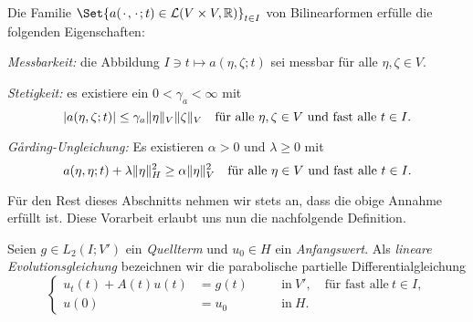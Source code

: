 \documentclass[../main.tex]{subfiles}
\begin{document}
\begin{Annahme}
\label{annahme:eigenschaften_der_bilinearform_a}
    Die Familie $\Set{a(\blank, \blank; t) \in \mathcal L(V \times V, \mathbb{R})}_{t \in I}$ von Bilinearformen erfülle die folgenden Eigenschaften:
    \leavevmode
    \begin{thmenumerate}
        \item \emph{Messbarkeit:} die Abbildung $I \ni t \mapsto a(\eta, \zeta; t)$ sei messbar für alle $\eta, \zeta \in V$.
        \item \emph{Stetigkeit:}
        es existiere ein $0 < \gamma_{a} < \infty$ mit
        \begin{equation}
            \label{eq:eigenschaften_der_bilinearform_a:stetigkeit}
            \abs{a(\eta, \zeta; t)} \leq \gamma_{a} \norm{\eta}_{V} \norm{\zeta}_{V} \quad \fa \eta, \zeta \in V \text{ und fast alle } t \in I.
        \end{equation}
        \item \emph{G\r{a}rding-Ungleichung:}
        Es existieren $\alpha > 0$ und $\lambda \geq 0$ mit
        \begin{equation}
            \label{eq:eigenschaften_der_bilinearform_a:garding}
            a(\eta, \eta; t) + \lambda \norm{\eta}_{H}^{2} \geq \alpha \norm{\eta}_{V}^{2} \quad \fa \eta \in V \text{ und fast alle } t \in I.
        \end{equation}
    \end{thmenumerate}
\end{Annahme}
%

Für den Rest dieses Abschnitts nehmen wir stets an, dass die obige Annahme erfüllt ist.
Diese Vorarbeit erlaubt uns nun die nachfolgende Definition.

\begin{Definition}
\label{definition:lineare_evolutionsgleichung}
    Seien $g \in L_{2}(I; V')$ ein \emph{Quellterm} und $u_{0} \in H$ ein \emph{Anfangswert}.
    Als \emph{lineare Evolutionsgleichung} bezeichnen wir die parabolische partielle Differentialgleichung
    \begin{equation}
        \label{eq:lineare_evolutionsgleichung}
        \left\{
        \begin{aligned}
            u_{t}(t) + A(t) u(t) &= g(t)     \quad&&\text{in}~V', \quad \text{für fast alle}~t \in I, \\
            u(0) &= u_{0}                    \quad&&\text{in}~H.
        \end{aligned}
        \right.
    \end{equation}
\end{Definition}
\end{document}
